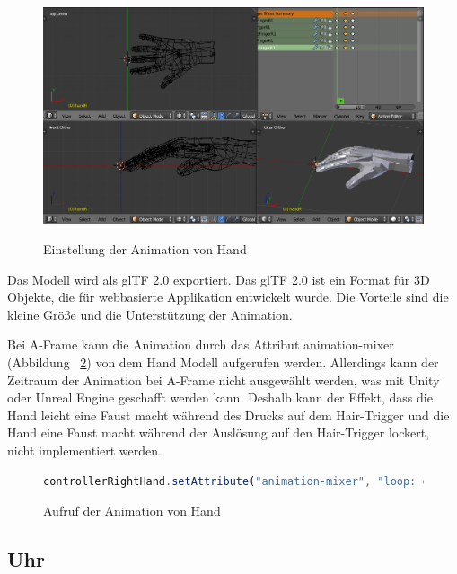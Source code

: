 \begin{figure}[ht]
\vspace*{1em}
\centering
\caption[Einstellung der Animation von Hand]{Einstellung der Animation von Hand}
\includegraphics[width=\textwidth]{images/handKeyframes.png}
\label{fig:handKeyframes} 
\end{figure}
 
 Das Modell wird als glTF 2.0 exportiert. Das glTF 2.0 ist ein Format für 3D Objekte, die für webbasierte Applikation entwickelt wurde. Die Vorteile sind die kleine Größe und die Unterstützung der Animation.
 
 Bei A-Frame kann die Animation durch das Attribut {\selectfont animation-mixer} (Abbildung ~\ref{fig:handAnimation}) von dem Hand Modell aufgerufen werden. Allerdings kann der Zeitraum der Animation bei A-Frame nicht ausgewählt werden, was mit Unity oder Unreal Engine geschafft werden kann. Deshalb kann der Effekt, dass die Hand leicht eine Faust macht während des Drucks auf dem Hair-Trigger und die Hand eine Faust macht während der Auslösung auf den Hair-Trigger lockert, nicht implementiert werden.
 
\begin{figure}[ht]
\vspace*{1em}
\centering
\caption[Aufruf der Animation von Hand]{Aufruf der Animation von Hand}
\begin{lstlisting}[language=JavaScript, style=htmlcssjs]
controllerRightHand.setAttribute("animation-mixer", "loop: once");
\end{lstlisting}
\label{fig:handAnimation} 
\end{figure}
 
 \subsection{Uhr}
 
